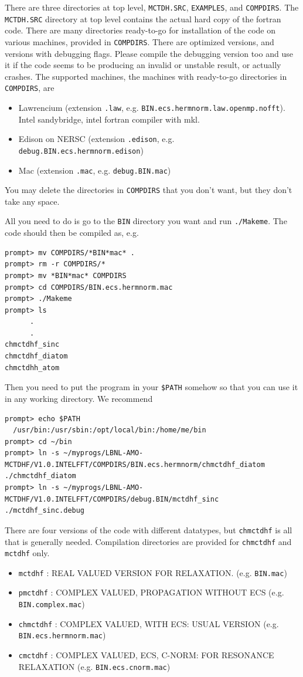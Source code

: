 \documentclass[10pt,leqno, oneside]{book}
\begin{document}
There are three directories at top level, \verb#MCTDH.SRC#, \verb#EXAMPLES#, and \verb#COMPDIRS#.  
The \verb#MCTDH.SRC# directory at top level contains the actual hard copy of the fortran code.
There are many directories ready-to-go for installation of the code on various machines, provided in \verb#COMPDIRS#.  
There are optimized versions, and versions with debugging flags.  Please compile the debugging version too and use it if the code
seems to be producing an invalid or unstable result, or actually crashes.  The supported machines, the machines with ready-to-go
directories in \verb#COMPDIRS#, are 
\begin{itemize}
\item{Lawrencium (extension \verb#.law#, e.g. \verb#BIN.ecs.hermnorm.law.openmp.nofft#).  Intel sandybridge, intel fortran compiler with mkl.}
\item{Edison on NERSC (extension \verb#.edison#, e.g. \verb#debug.BIN.ecs.hermnorm.edison#)}
\item{Mac (extension \verb#.mac#, e.g. \verb#debug.BIN.mac#)}
\end{itemize}

You may delete the directories in \verb#COMPDIRS# that you don't want, but they don't take any space.

All you need to do is go to the \verb#BIN# directory you want and run \verb#./Makeme#.  The code should then be compiled as, e.g.
{\footnotesize
\begin{verbatim}
prompt> mv COMPDIRS/*BIN*mac* .
prompt> rm -r COMPDIRS/*
prompt> mv *BIN*mac* COMPDIRS
prompt> cd COMPDIRS/BIN.ecs.hermnorm.mac
prompt> ./Makeme
prompt> ls
      .
      .
chmctdhf_sinc
chmctdhf_diatom
chmctdhh_atom
\end{verbatim}}

Then you need to put the program in your \verb#$PATH# somehow so that you can use it in any working directory.  We recommend
{\footnotesize
\begin{verbatim}
prompt> echo $PATH
  /usr/bin:/usr/sbin:/opt/local/bin:/home/me/bin
prompt> cd ~/bin
prompt> ln -s ~/myprogs/LBNL-AMO-MCTDHF/V1.0.INTELFFT/COMPDIRS/BIN.ecs.hermnorm/chmctdhf_diatom ./chmctdhf_diatom
prompt> ln -s ~/myprogs/LBNL-AMO-MCTDHF/V1.0.INTELFFT/COMPDIRS/debug.BIN/mctdhf_sinc ./mctdhf_sinc.debug
\end{verbatim}}

There are four versions of the code with different datatypes, but \verb#chmctdhf# is all that is generally needed.  Compilation directories 
are provided for \verb#chmctdhf# and \verb#mctdhf# only.
\begin{itemize}
\item{\verb#mctdhf# : REAL VALUED VERSION FOR RELAXATION. (e.g. \verb#BIN.mac#) }
\item{ \verb#pmctdhf# : COMPLEX VALUED, PROPAGATION WITHOUT ECS (e.g. \verb#BIN.complex.mac#)}
\item{ \verb#chmctdhf# : COMPLEX VALUED, WITH ECS: USUAL VERSION (e.g. \verb#BIN.ecs.hermnorm.mac#)}  
\item{ \verb#cmctdhf# : COMPLEX VALUED, ECS, C-NORM: FOR RESONANCE RELAXATION (e.g. \verb#BIN.ecs.cnorm.mac#)}
\end{itemize}
\end{document}
